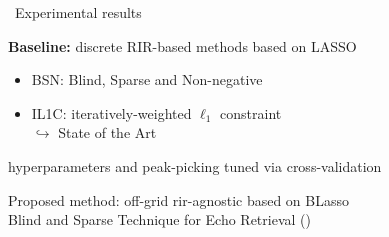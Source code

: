\begin{frame}[t]{\faFlask~Experimental results \hfill\faJediOrder}
    \begin{mysotablock}

        \textbf{Baseline:} discrete RIR-based methods based on LASSO
        \begin{itemize}
            \item BSN: Blind, Sparse and Non-negative \cite{lin2007blind}
            \item IL1C: iteratively-weighted $\ell_1$ constraint~\cite{crocco2015room}
            \\\hspace{.3em} $\hookrightarrow$ State of the Art
        \end{itemize}
        {\footnotesize \hfill hyperparameters and peak-picking tuned via cross-validation}
    \end{mysotablock}

    \vspace{2mm}
    \begin{mycontriblock}
        Proposed method: off-grid rir-agnostic based on BLasso
        \\Blind and Sparse Technique for Echo Retrieval (\blaster)
    \end{mycontriblock}

\end{frame}


